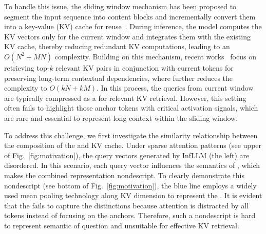 To handle this issue, the sliding window mechanism has been proposed to segment the input sequence into content blocks and incrementally convert them into a  key-value (KV) cache for reuse~\cite{beltagy2020longformer}. 
During inference, the model computes the KV vectors only for the current window and integrates them with the existing KV cache, thereby reducing redundant KV computations, leading to an $O(N^2+MN)$ complexity.
Building on this mechanism, recent works~\cite{infllm,liu2024retrievalattention} focus on retrieving top-$k$ relevant KV pairs in conjunction with current tokens for preserving long-term contextual dependencies, where further reduces the complexity to $O(kN+kM)$.
In this process, the queries from current window are typically compressed as a \textbf{\pq} for relevant KV retrieval. However, this \pq setting often fails to highlight those anchor tokens with critical activation signals, which are rare and essential to represent long context within the sliding window.

To address this challenge, we first investigate the similarity relationship between the composition of the \pq and KV cache.
Under sparse attention patterns (see upper of Fig.~\ref{fig:motivation}), the query vectors generated by InfLLM (the left) are disordered. In this scenario, each query vector influences the semantics of \pq, which makes the combined representation nondescript. To clearly demonstrate this nondescript (see bottom of Fig.~\ref{fig:motivation}), the {blue line}  employs a widely used mean pooling technology along KV dimension to represent the \pq. It is evident that the \pq fails to capture the distinctions because attention is distracted by all tokens instead of focusing on the anchors.
Therefore, such a nondescript \pq is hard to represent semantic of question and unsuitable for effective KV retrieval.



